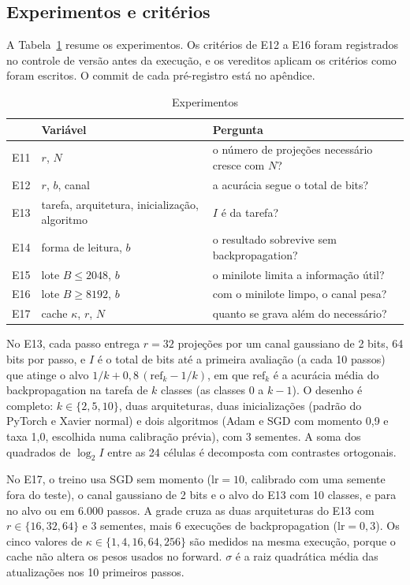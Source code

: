 \documentclass[journal]{IEEEtran}
\begin{document}
\subsection{Experimentos e critérios}

A Tabela~\ref{tab:exps} resume os experimentos. Os critérios de E12 a E16 foram registrados no controle de versão antes da execução, e os vereditos aplicam os critérios como foram escritos. O commit de cada pré-registro está no apêndice.

\begin{table}[t]
\centering
\caption{Experimentos}
\label{tab:exps}
\begin{tabular}{lp{}p{}}
\toprule
& Variável & Pergunta \\
\midrule
E11 & $r$, $N$ & o número de projeções necessário cresce com $N$? \\
E12 & $r$, $b$, canal & a acurácia segue o total de bits? \\
E13 & tarefa, arquitetura, inicialização, algoritmo & $I$ é da tarefa? \\
E14 & forma de leitura, $b$ & o resultado sobrevive sem backpropagation? \\
E15 & lote $B \le 2048$, $b$ & o minilote limita a informação útil? \\
E16 & lote $B \ge 8192$, $b$ & com o minilote limpo, o canal pesa? \\
E17 & cache $\kappa$, $r$, $N$ & quanto se grava além do necessário? \\
\bottomrule
\end{tabular}
\end{table}

No E13, cada passo entrega $r = 32$ projeções por um canal gaussiano de 2 bits, 64 bits por passo, e $I$ é o total de bits até a primeira avaliação (a cada 10 passos) que atinge o alvo $1/k + 0{,}8\,(\text{ref}_k - 1/k)$, em que $\text{ref}_k$ é a acurácia média do backpropagation na tarefa de $k$ classes (as classes $0$ a $k-1$). O desenho é completo: $k \in \{2, 5, 10\}$, duas arquiteturas, duas inicializações (padrão do PyTorch e Xavier normal) e dois algoritmos (Adam e SGD com momento 0,9 e taxa 1,0, escolhida numa calibração prévia), com 3 sementes. A soma dos quadrados de $\log_2 I$ entre as 24 células é decomposta com contrastes ortogonais.

No E17, o treino usa SGD sem momento ($\mathrm{lr} = 10$, calibrado com uma semente fora do teste), o canal gaussiano de 2 bits e o alvo do E13 com 10 classes, e para no alvo ou em 6.000 passos. A grade cruza as duas arquiteturas do E13 com $r \in \{16, 32, 64\}$ e 3 sementes, mais 6 execuções de backpropagation ($\mathrm{lr} = 0{,}3$). Os cinco valores de $\kappa \in \{1, 4, 16, 64, 256\}$ são medidos na mesma execução, porque o cache não altera os pesos usados no forward. $\sigma$ é a raiz quadrática média das atualizações nos 10 primeiros passos.
\end{document}
